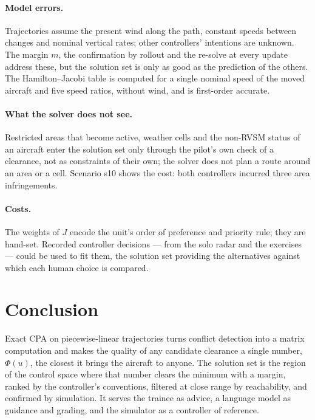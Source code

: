 \documentclass[11pt,a4paper]{article}
\begin{document}
\paragraph{Model errors.} Trajectories assume the present wind along the path, constant speeds between changes and
nominal vertical rates; other controllers' intentions are unknown. The margin $m$, the confirmation by rollout and
the re-solve at every update address these, but the solution set is only as good as the prediction of the
others. The Hamilton--Jacobi table is computed for a single nominal speed of the moved aircraft and five speed
ratios, without wind, and is first-order accurate.

\paragraph{What the solver does not see.} Restricted areas that become active, weather cells and the non-RVSM
status of an aircraft enter the solution set only through the pilot's own check of a clearance, not as constraints
of their own; the solver does not plan a route around an area or a cell. Scenario s10 shows the cost: both
controllers incurred three area infringements.

\paragraph{Costs.} The weights of $J$ encode the unit's order of preference and priority rule; they are hand-set.
Recorded controller decisions --- from the solo radar and the exercises --- could be used to fit them, the solution
set providing the alternatives against which each human choice is compared.

\section{Conclusion}

Exact CPA on piecewise-linear trajectories turns conflict detection into a matrix computation and makes the quality
of any candidate clearance a single number, $\Phi(u)$, the closest it brings the aircraft to anyone. The solution set
is the region of the control space where that number clears the minimum with a margin, ranked by the controller's
conventions, filtered at close range by reachability, and confirmed by simulation. It serves the trainee as advice,
a language model as guidance and grading, and the simulator as a controller of reference.
\end{document}
